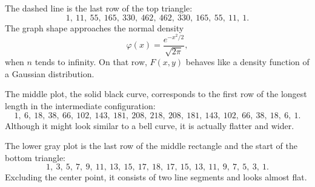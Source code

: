\documentclass[11pt]{article}
\theoremstyle{definition}
\theoremstyle{remark}
\begin{document}
The dashed line is the last row of the top triangle:
\[1,\ 11,\ 55,\ 165,\ 330,\ 462,\ 462,\ 330,\ 165,\ 55,\ 11,\ 1.\]
The graph shape approaches the normal density
\[{\varphi (x)={\frac {e^{-x^{2}/2}}{\sqrt {2\pi }}},}\]
when $n$ tends to infinity. On that row, $F(x, y)$ behaves like a density function of a Gaussian distribution.

The middle plot, the solid black curve, corresponds to the first row of the longest length in the intermediate configuration:
\[1,\ 6,\ 18,\ 38,\ 66,\ 102,\ 143,\ 181,\ 208,\ 218,\ 208,\ 181,\ 143,\ 102,\ 66,\ 38,\ 18,\ 6,\ 1.\]
Although it might look similar to a bell curve, it is actually flatter and wider.

The lower gray plot is the last row of the middle rectangle and the start of the bottom triangle:
\[1,\ 3,\ 5,\ 7,\ 9,\ 11,\ 13,\ 15,\ 17,\ 18,\ 17,\ 15,\ 13,\ 11,\ 9,\ 7,\ 5,\ 3,\ 1.\]
Excluding the center point, it consists of two line segments and looks almost flat.
\end{document}
